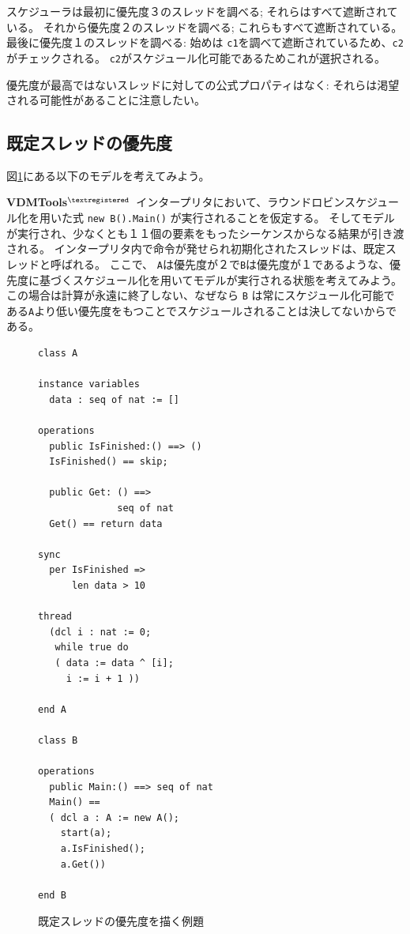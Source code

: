 \documentclass[\pformat,12pt]{jreport}
\newcommand{\vdmtools}{\textbf{VDMTools}$^{\mathbf{{\textregistered}}}$}
\begin{document}
スケジューラは最初に優先度３のスレッドを調べる; それらはすべて遮断されている。
それから優先度２のスレッドを調べる; これらもすべて遮断されている。
最後に優先度１のスレッドを調べる: 始めは \texttt{c1}を調べて遮断されているため、\texttt{c2} がチェックされる。
 \texttt{c2}がスケジュール化可能であるためこれが選択される。

優先度が最高ではないスレッドに対しての公式プロパティはなく: それらは渇望される可能性があることに注意したい。

\subsection{既定スレッドの優先度}

 図\ref{fig:priodefault}にある以下のモデルを考えてみよう。

 \vdmtools\ インタープリタにおいて、ラウンドロビンスケジュール化を用いた式 \texttt{new B().Main()} が実行されることを仮定する。
そしてモデルが実行され、少なくとも１１個の要素をもったシーケンスからなる結果が引き渡される。
インタープリタ内で命令が発せられ初期化されたスレッドは、既定スレッドと呼ばれる。
ここで、 \texttt{A}は優先度が２で\texttt{B}は優先度が１であるような、優先度に基づくスケジュール化を用いてモデルが実行される状態を考えてみよう。
この場合は計算が永遠に終了しない、なぜなら \texttt{B} は常にスケジュール化可能である\texttt{A}より低い優先度をもつことでスケジュールされることは決してないからである。

\begin{figure}
\begin{lstlisting}
class A

instance variables
  data : seq of nat := []

operations
  public IsFinished:() ==> ()
  IsFinished() == skip;

  public Get: () ==>
              seq of nat
  Get() == return data

sync
  per IsFinished =>
      len data > 10

thread
  (dcl i : nat := 0;
   while true do
   ( data := data ^ [i];
     i := i + 1 ))

end A

class B

operations
  public Main:() ==> seq of nat
  Main() ==
  ( dcl a : A := new A();
    start(a);
    a.IsFinished();
    a.Get())

end B
\end{lstlisting}
\caption{既定スレッドの優先度を描く例題\label{fig:priodefault}}
\end{figure}
\end{document}
